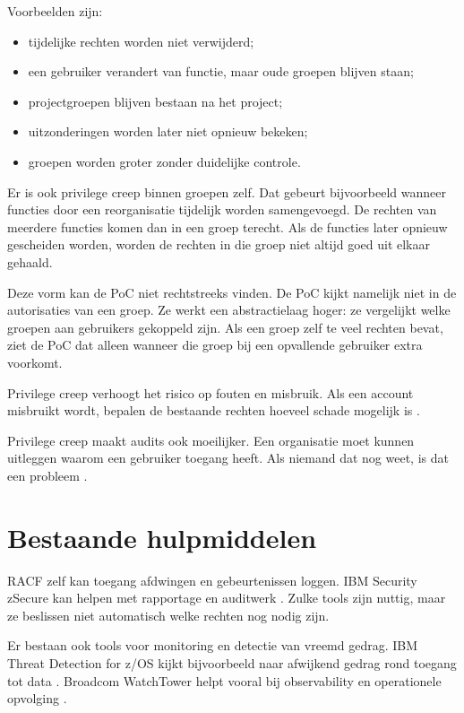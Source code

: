 Voorbeelden zijn:

\begin{itemize}
	\item tijdelijke rechten worden niet verwijderd;
	\item een gebruiker verandert van functie, maar oude groepen blijven staan;
	\item projectgroepen blijven bestaan na het project;
	\item uitzonderingen worden later niet opnieuw bekeken;
	\item groepen worden groter zonder duidelijke controle.
\end{itemize}

Er is ook privilege creep binnen groepen zelf. Dat gebeurt bijvoorbeeld wanneer functies door een reorganisatie tijdelijk worden samengevoegd. De rechten van meerdere functies komen dan in een groep terecht. Als de functies later opnieuw gescheiden worden, worden de rechten in die groep niet altijd goed uit elkaar gehaald.

Deze vorm kan de PoC niet rechtstreeks vinden. De PoC kijkt namelijk niet in de autorisaties van een groep. Ze werkt een abstractielaag hoger: ze vergelijkt welke groepen aan gebruikers gekoppeld zijn. Als een groep zelf te veel rechten bevat, ziet de PoC dat alleen wanneer die groep bij een opvallende gebruiker extra voorkomt.

Privilege creep verhoogt het risico op fouten en misbruik. Als een account misbruikt wordt, bepalen de bestaande rechten hoeveel schade mogelijk is \autocite{Buecker2014,NISTSP80053r5}.

Privilege creep maakt audits ook moeilijker. Een organisatie moet kunnen uitleggen waarom een gebruiker toegang heeft. Als niemand dat nog weet, is dat een probleem \autocite{IBMRACFAuditor2023}.

\section{Bestaande hulpmiddelen}

RACF zelf kan toegang afdwingen en gebeurtenissen loggen. IBM Security zSecure kan helpen met rapportage en auditwerk \autocite{BueckerZSecure2011}. Zulke tools zijn nuttig, maar ze beslissen niet automatisch welke rechten nog nodig zijn.

Er bestaan ook tools voor monitoring en detectie van vreemd gedrag. IBM Threat Detection for z/OS kijkt bijvoorbeeld naar afwijkend gedrag rond toegang tot data \autocite{IBMThreatDetectionZOS2024}. Broadcom WatchTower helpt vooral bij observability en operationele opvolging \autocite{BroadcomWatchTower2024}.

